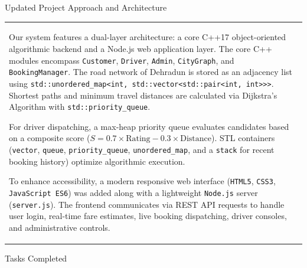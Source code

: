 \documentclass[12pt,a4paper]{article}
\newcommand{\sectiontitle}[1]{%
    {\color{GEUBlue}
    \fontsize{18}{22}\selectfont #1}
}
\newcommand{\answerbox}[2]{%
    \begin{tabularx}{\textwidth}{
        |>{\RaggedRight\arraybackslash}X|}
        \hline
        \parbox[t][#1][t]{\dimexpr\linewidth-12pt\relax}{
            \vspace{5pt}
            \fontsize{11}{13}\selectfont #2
        }\\
        \hline
    \end{tabularx}
}
\begin{document}
\vspace{0.70cm}

\sectiontitle{Updated Project Approach and Architecture}

\vspace{0.05cm}

\vspace{0.25cm}

\answerbox{7.60cm}{
Our system features a dual-layer architecture: a core C++17 object-oriented algorithmic backend and a Node.js web application layer. The core C++ modules encompass \texttt{Customer}, \texttt{Driver}, \texttt{Admin}, \texttt{CityGraph}, and \texttt{BookingManager}. The road network of Dehradun is stored as an adjacency list using \texttt{std::unordered\_map<int, std::vector<std::pair<int, int>{}>{}>}. Shortest paths and minimum travel distances are calculated via Dijkstra's Algorithm with \texttt{std::priority\_queue}.

For driver dispatching, a max-heap priority queue evaluates candidates based on a composite score ($S = 0.7 \times \text{Rating} - 0.3 \times \text{Distance}$). STL containers (\texttt{vector}, \texttt{queue}, \texttt{priority\_queue}, \texttt{unordered\_map}, and a \texttt{stack} for recent booking history) optimize algorithmic execution.

To enhance accessibility, a modern responsive web interface (\texttt{HTML5}, \texttt{CSS3}, \texttt{JavaScript ES6}) was added along with a lightweight \texttt{Node.js} server (\texttt{server.js}). The frontend communicates via REST API requests to handle user login, real-time fare estimates, live booking dispatching, driver consoles, and administrative controls.
}

\newpage

\vspace*{0.20cm}

\sectiontitle{Tasks Completed}

\vspace{0.05cm}

\vspace{0.20cm}
\end{document}

